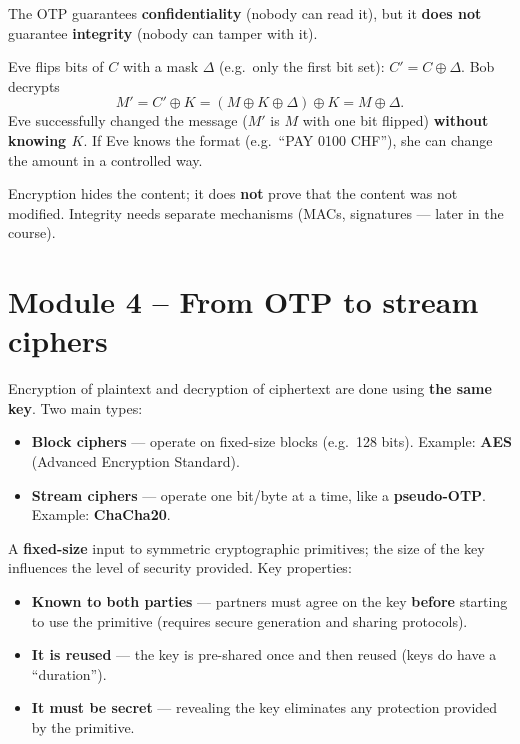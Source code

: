 \begin{defnbox}[title={OTP: integrity is NOT included (malleability)}]
The OTP guarantees \textbf{confidentiality} (nobody can read it), but it \textbf{does
not} guarantee \textbf{integrity} (nobody can tamper with it).
\end{defnbox}

\begin{exbox}[title=Bit-flipping attack]
Eve flips bits of $C$ with a mask $\Delta$ (e.g.\ only the first bit set):
$C' = C \oplus \Delta$. Bob decrypts
\[
  M' = C' \oplus K = (M \oplus K \oplus \Delta) \oplus K = M \oplus \Delta .
\]
Eve successfully changed the message ($M'$ is $M$ with one bit flipped)
\textbf{without knowing $K$}. If Eve knows the format (e.g.\ ``PAY 0100 CHF''), she can
change the amount in a controlled way.
\end{exbox}

\begin{warnbox}[title={Confidentiality $\neq$ integrity}]
Encryption hides the content; it does \textbf{not} prove that the content was not
modified. Integrity needs separate mechanisms (MACs, signatures --- later in the course).
\end{warnbox}

\section{Module 4 -- From OTP to stream ciphers}

\begin{defnbox}[title=Symmetric encryption]
Encryption of plaintext and decryption of ciphertext are done using \textbf{the same
key}. Two main types:
\begin{itemize}
  \item \textbf{Block ciphers} --- operate on fixed-size blocks (e.g.\ 128 bits).
        Example: \textbf{AES} (Advanced Encryption Standard).
  \item \textbf{Stream ciphers} --- operate one bit/byte at a time, like a
        \textbf{pseudo-OTP}. Example: \textbf{ChaCha20}.
\end{itemize}
\end{defnbox}

\begin{defnbox}[title=Symmetric cryptographic key]
A \textbf{fixed-size} input to symmetric cryptographic primitives; the size of the key
influences the level of security provided. Key properties:
\begin{itemize}
  \item \textbf{Known to both parties} --- partners must agree on the key
        \textbf{before} starting to use the primitive (requires secure generation and
        sharing protocols).
  \item \textbf{It is reused} --- the key is pre-shared once and then reused (keys do
        have a ``duration'').
  \item \textbf{It must be secret} --- revealing the key eliminates any protection
        provided by the primitive.
\end{itemize}
\end{defnbox}

